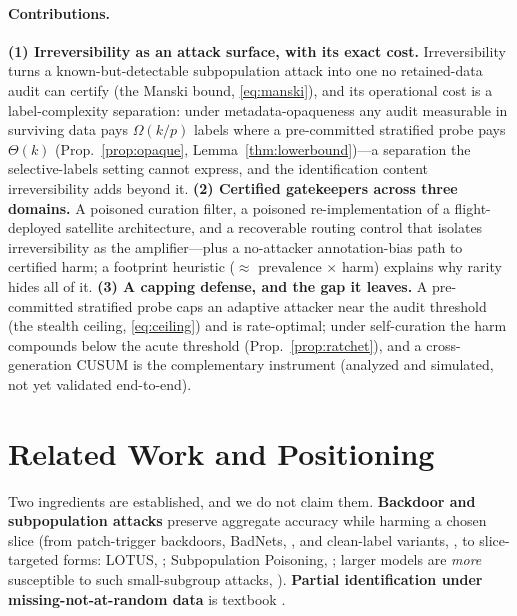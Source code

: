 \documentclass[conference]{IEEEtran}
\begin{document}
\paragraph{Contributions.}
\textbf{(1) Irreversibility as an attack surface, with its exact cost.} Irreversibility turns a
known-but-detectable subpopulation attack into one no retained-data audit can certify (the Manski bound,
\eqref{eq:manski}), and its operational cost is a label-complexity separation: under metadata-opaqueness any
audit measurable in surviving data pays $\Omega(k/p)$ labels where a pre-committed stratified probe pays
$\Theta(k)$ (Prop.~\ref{prop:opaque}, Lemma~\ref{thm:lowerbound})---a separation the selective-labels setting
cannot express, and the identification content irreversibility adds beyond it.
\textbf{(2) Certified gatekeepers across three domains.} A poisoned curation filter, a poisoned re-implementation
of a flight-deployed satellite architecture, and a recoverable routing control that isolates irreversibility as
the amplifier---plus a no-attacker annotation-bias path to certified harm; a footprint heuristic
($\approx$ prevalence $\times$ harm) explains why rarity hides all of it.
\textbf{(3) A capping defense, and the gap it leaves.} A pre-committed stratified probe caps an adaptive
attacker near the audit threshold (the stealth ceiling, \eqref{eq:ceiling}) and is rate-optimal; under
self-curation the harm compounds below the acute threshold (Prop.~\ref{prop:ratchet}), and a cross-generation
CUSUM is the complementary instrument (analyzed and simulated, not yet validated end-to-end).

\section{Related Work and Positioning}
Two ingredients are established, and we do not claim them. \textbf{Backdoor and subpopulation
attacks} preserve aggregate accuracy while harming a chosen slice (from patch-trigger backdoors, BadNets, \cite{gu2017}, and clean-label variants, \cite{turner2019}, to slice-targeted forms: LOTUS, \cite{cheng2024};
Subpopulation Poisoning, \cite{jagielski2021}; larger models are \emph{more} susceptible to such small-subgroup
attacks, \cite{gupta2024}). \textbf{Partial identification under missing-not-at-random data} is
textbook \cite{manski2003}.
\end{document}
